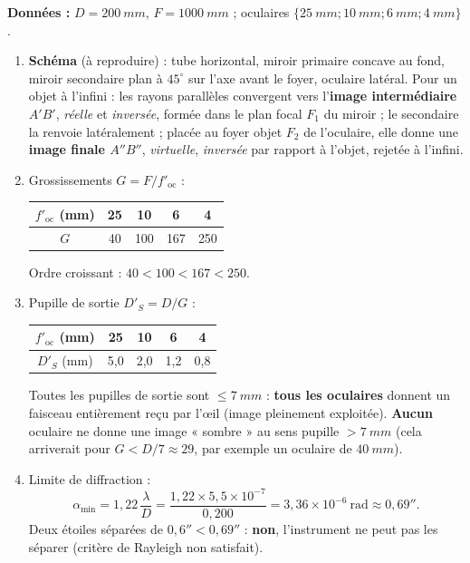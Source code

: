 \documentclass[11pt]{article}
\begin{document}
\begin{corrige}
\textbf{Données :} $D = \SI{200}{mm}$, $F = \SI{1000}{mm}$ ; oculaires $\{\SI{25}{mm} ; \SI{10}{mm} ; \SI{6}{mm} ; \SI{4}{mm}\}$.
\begin{enumerate}
    \item \textbf{Schéma} (à reproduire) : tube horizontal, miroir primaire concave au fond, miroir secondaire plan à $45^\circ$ sur l'axe avant le foyer, oculaire latéral. Pour un objet à l'infini : les rayons parallèles convergent vers l'\textbf{image intermédiaire $A'B'$}, \emph{réelle} et \emph{inversée}, formée dans le plan focal $F_1$ du miroir ; le secondaire la renvoie latéralement ; placée au foyer objet $F_2$ de l'oculaire, elle donne une \textbf{image finale $A''B''$}, \emph{virtuelle}, \emph{inversée} par rapport à l'objet, rejetée à l'infini.
    \item Grossissements $G = F/f'_{\text{oc}}$ :
    \begin{center}
    \begin{tabular}{|c|cccc|}\hline
    $f'_{\text{oc}}$ (mm) & 25 & 10 & 6 & 4 \\ \hline
    $G$ & 40 & 100 & 167 & 250 \\ \hline
    \end{tabular}
    \end{center}
    Ordre croissant : $40 < 100 < 167 < 250$.
    \item Pupille de sortie $D'_S = D/G$ :
    \begin{center}
    \begin{tabular}{|c|cccc|}\hline
    $f'_{\text{oc}}$ (mm) & 25 & 10 & 6 & 4 \\ \hline
    $D'_S$ (mm) & 5,0 & 2,0 & 1,2 & 0,8 \\ \hline
    \end{tabular}
    \end{center}
    Toutes les pupilles de sortie sont $\leq \SI{7}{mm}$ : \textbf{tous les oculaires} donnent un faisceau entièrement reçu par l'œil (image pleinement exploitée). \textbf{Aucun} oculaire ne donne une image « sombre » au sens pupille $> \SI{7}{mm}$ (cela arriverait pour $G < D/7 \approx 29$, par exemple un oculaire de $\SI{40}{mm}$).
    \item Limite de diffraction :
    \[ \alpha_{\min} = 1,22\,\frac{\lambda}{D} = \frac{1,22 \times 5,5\times10^{-7}}{0,200} = 3,36\times10^{-6}\ \text{rad} \approx 0,69''. \]
    Deux étoiles séparées de $0,6'' < 0,69''$ : \textbf{non}, l'instrument ne peut pas les séparer (critère de Rayleigh non satisfait).

\end{enumerate}
\end{corrige}
\end{document}
